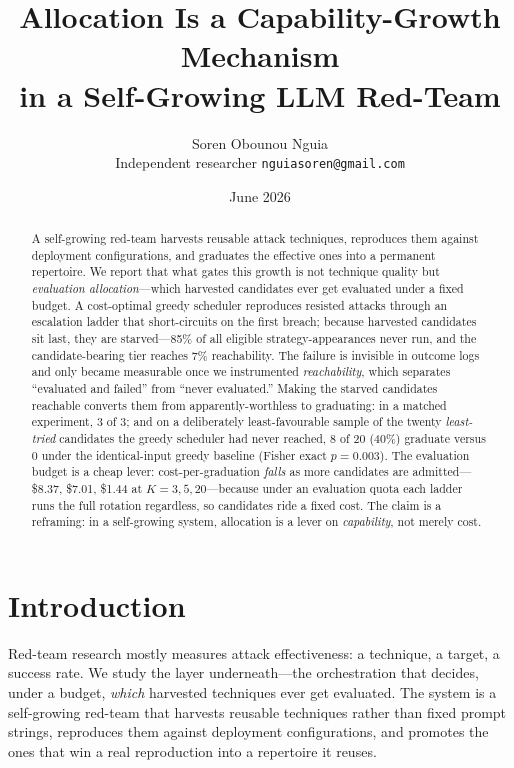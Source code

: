 \documentclass[11pt]{article}
\title{Allocation Is a Capability-Growth Mechanism\\
in a Self-Growing LLM Red-Team}
\author{Soren Obounou Nguia\\
\small Independent researcher \quad \texttt{nguiasoren@gmail.com}}
\date{June 2026}
\begin{document}
\maketitle

\begin{abstract}
\noindent
A self-growing red-team harvests reusable attack techniques, reproduces them against deployment configurations, and graduates the effective ones into a permanent repertoire. We report that what gates this growth is not technique quality but \emph{evaluation allocation}---which harvested candidates ever get evaluated under a fixed budget. A cost-optimal greedy scheduler reproduces resisted attacks through an escalation ladder that short-circuits on the first breach; because harvested candidates sit last, they are starved---85\% of all eligible strategy-appearances never run, and the candidate-bearing tier reaches 7\% reachability. The failure is invisible in outcome logs and only became measurable once we instrumented \emph{reachability}, which separates ``evaluated and failed'' from ``never evaluated.'' Making the starved candidates reachable converts them from apparently-worthless to graduating: in a matched experiment, 3 of 3; and on a deliberately least-favourable sample of the twenty \emph{least-tried} candidates the greedy scheduler had never reached, 8 of 20 (40\%) graduate versus 0 under the identical-input greedy baseline (Fisher exact $p=0.003$). The evaluation budget is a cheap lever: cost-per-graduation \emph{falls} as more candidates are admitted---\$8.37, \$7.01, \$1.44 at $K=3,5,20$---because under an evaluation quota each ladder runs the full rotation regardless, so candidates ride a fixed cost. The claim is a reframing: in a self-growing system, allocation is a lever on \emph{capability}, not merely cost.
\end{abstract}

\section{Introduction}

Red-team research mostly measures attack effectiveness: a technique, a target, a success rate. We study the layer underneath---the orchestration that decides, under a budget, \emph{which} harvested techniques ever get evaluated. The system is a self-growing red-team that harvests reusable techniques rather than fixed prompt strings, reproduces them against deployment configurations, and promotes the ones that win a real reproduction into a repertoire it reuses.
\end{document}

